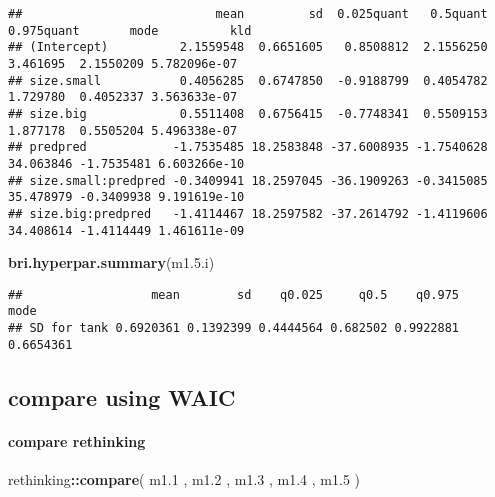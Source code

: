 \documentclass[
]{article}
\newenvironment{Shaded}{\begin{snugshade}}{\end{snugshade}}
\newcommand{\FloatTok}[1]{\textcolor[rgb]{0.00,0.00,0.81}{#1}}
\newcommand{\KeywordTok}[1]{\textcolor[rgb]{0.13,0.29,0.53}{\textbf{#1}}}
\newcommand{\NormalTok}[1]{#1}
\newcommand{\OperatorTok}[1]{\textcolor[rgb]{0.81,0.36,0.00}{\textbf{#1}}}
\begin{document}
\begin{verbatim}
##                           mean         sd  0.025quant   0.5quant 0.975quant       mode          kld
## (Intercept)          2.1559548  0.6651605   0.8508812  2.1556250   3.461695  2.1550209 5.782096e-07
## size.small           0.4056285  0.6747850  -0.9188799  0.4054782   1.729780  0.4052337 3.563633e-07
## size.big             0.5511408  0.6756415  -0.7748341  0.5509153   1.877178  0.5505204 5.496338e-07
## predpred            -1.7535485 18.2583848 -37.6008935 -1.7540628  34.063846 -1.7535481 6.603266e-10
## size.small:predpred -0.3409941 18.2597045 -36.1909263 -0.3415085  35.478979 -0.3409938 9.191619e-10
## size.big:predpred   -1.4114467 18.2597582 -37.2614792 -1.4119606  34.408614 -1.4114449 1.461611e-09
\end{verbatim}

\begin{Shaded}
\begin{Highlighting}[]
\KeywordTok{bri.hyperpar.summary}\NormalTok{(m1.}\FloatTok{5.}\NormalTok{i)}
\end{Highlighting}
\end{Shaded}

\begin{verbatim}
##                  mean        sd    q0.025     q0.5    q0.975      mode
## SD for tank 0.6920361 0.1392399 0.4444564 0.682502 0.9922881 0.6654361
\end{verbatim}

\hypertarget{compare-using-waic}{%
\subsection{compare using WAIC}\label{compare-using-waic}}

\hypertarget{compare-rethinking}{%
\paragraph{compare rethinking}\label{compare-rethinking}}

\begin{Shaded}
\begin{Highlighting}[]
\NormalTok{rethinking}\OperatorTok{::}\KeywordTok{compare}\NormalTok{( m1}\FloatTok{.1}\NormalTok{ , m1}\FloatTok{.2}\NormalTok{ , m1}\FloatTok{.3}\NormalTok{ , m1}\FloatTok{.4}\NormalTok{ , m1}\FloatTok{.5}\NormalTok{ )}
\end{Highlighting}
\end{Shaded}
\end{document}
